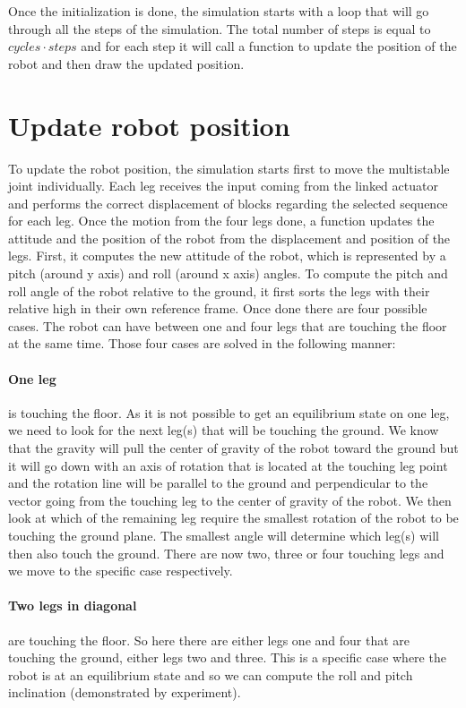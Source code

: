         Once the initialization is done, the simulation starts with a loop that will go through all the steps of the simulation. The total number of steps is equal to $cycles \cdot steps$ and for each step it will call a function to update the position of the robot and then draw the updated position. 
        
    \section{Update robot position}
        To update the robot position, the simulation starts first to move the multistable joint individually. Each leg receives the input coming from the linked actuator and performs the correct displacement of blocks regarding the selected sequence for each leg. Once the motion from the four legs done, a function updates the attitude and the position of the robot from the displacement and position of the legs.
        First, it computes the new attitude of the robot, which is represented by a pitch (around y axis) and roll (around x axis) angles. To compute the pitch and roll angle of the robot relative to the ground, it first sorts the legs with their relative high in their own reference frame. Once done there are four possible cases. The robot can have between one and four legs that are touching the floor at the same time. Those four cases are solved in the following manner:
            \paragraph{One leg} is touching the floor. As it is not possible to get an equilibrium state on one leg, we need to look for the next leg(s) that will be touching the ground. We know that the gravity will pull the center of gravity of the robot toward the ground but it will go down with an axis of rotation that is located at the touching leg point and the rotation line will be parallel to the ground and perpendicular to the vector going from the touching leg to the center of gravity of the robot. We then look at which of the remaining leg require the smallest rotation of the robot to be touching the ground plane. The smallest angle will determine which leg(s) will then also touch the ground. There are now two, three or four touching legs and we move to the specific case respectively.
            \paragraph{Two legs in diagonal} are touching the floor. So here there are either legs one and four that are touching the ground, either legs two and three. This is a specific case where the robot is at an equilibrium state and so we can compute the roll and pitch inclination (demonstrated by experiment). 
